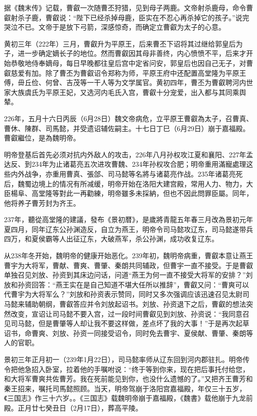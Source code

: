 据《魏末传》记载，曹叡一次随曹丕狩猎，见到母子两鹿。文帝射杀鹿母，命令曹叡射杀子鹿，曹叡说：“陛下已经杀掉母鹿，臣实在不忍心再杀掉它的孩子。”说完哭泣不已。文帝于是放下弓箭，深感惊奇，而确定立曹叡为太子的心意。

黄初三年（222年）三月，曹叡升为平原王，后来曹丕下诏将其过继给郭皇后为子，进一步确定嫡长子的地位。然而曹叡因其母非善终，内心愤愤不平，后来才开始恭敬地侍奉嫡母，每日早晚都往皇后宫中定省问安，郭皇后也因自己无子，对曹叡慈爱有加。除了曹丕为曹叡诏令郑称为师，平原王府中还配置高堂隆为平原王傅，毌丘俭、何曾、吉茂等一干人等为文学属官。黄初四年，曹丕为曹叡聘河内世家大族虞氏为平原王妃，又选河内毛氏入宫，曹叡十分宠爱，出入都与其同乘舆辇。

226年，五月十六日丙辰（6月28日）魏文帝病危，立平原王曹叡為太子，召曹真、曹休、陳群、司馬懿，并受遗诏辅佐嗣主。十七日丁巳（6月29日）崩于嘉福殿。曹叡繼位，是為魏明帝。

明帝登基后首先必须对抗内外敌人的攻击，226年八月孙权攻江夏和襄阳、227年孟达反、到234年为止诸葛亮五次进攻曹魏、234年孙权攻合肥；明帝重用滿寵處理这些内外战争，亦重用曹真、張郃、司马懿等名將与诸葛亮作战。235年诸葛亮死后，魏蜀边境上的情况有所减缓，明帝开始在洛阳大建宫殿，常用人力、物力，大臣楊阜、高堂隆等對此一再勸練，明帝雖多未採納，但也不因此問罪臣屬。同年，他将养子曹芳封为齐王。

237年，聽從高堂隆的建議，發布《景初暦》，是歲將青龍五年春三月改為景初元年夏四月，同年辽东公孙渊造反，自立为燕王，明帝令司马懿攻辽东，司马懿遂带兵四万，和夏侯霸等人出征辽东，大破燕军，杀公孙渊，成功收复辽东。

从238年冬开始，魏明帝的健康开始恶化。239年初，魏明帝病重，曹叡本意让燕王曹宇为大将军，曹献、曹爽、曹肇、秦朗共同辅政，但曹宇一直不接受。于是曹叡单独召见刘放、孙资到其床边问话，问道“燕王为何一直不接受大将军的安排？”刘放和孙资回答：“燕王实在是自己知道不堪大任所以推辞”，曹叡又问：“曹爽可以代曹宇为大将军么？”刘放和孙资表示赞同，同时又多次强调应该迅速召见太尉司马懿来辅助朝纲，曹叡答应并令刘放起诏书。刘放、孙资退下之后，曹叡的想法突然改变，宣诏让司马懿不要入宫，过一段时间曹叡见到刘放、孙资说：“我同意召见司马懿，但是曹肇等人却让我不要这样做，差点坏了我的大事！”于是再次起草诏书，命曹爽、刘放、孙资一同接受诏令，同时免去曹宇、夏侯献、曹肇、秦朗等人的官职。

景初三年正月初一（239年1月22日），司马懿率师从辽东回到河内郡驻扎。明帝传令把他急招入卧室，拉着他的手嘱咐说：“终于等到你来，现在把后事托付给您，和大将军曹爽共佐曹芳。我在死前能见到你，也没什么遗憾的了。”又把齐王曹芳和秦王招来，嘱托司馬懿照顾。当天，明帝驾崩于洛阳宫嘉福殿，年仅三十五岁，《三国志》作三十六岁。。《三国志》载魏明帝崩于嘉福殿，《魏書》载他崩于九龙前殿。正月廿七癸丑日（2月17日），葬高平陵。

